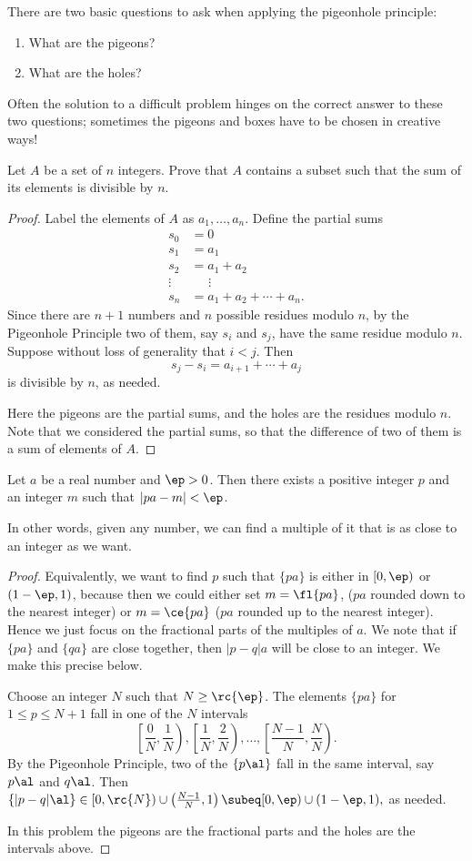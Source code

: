 There are two basic questions to ask when applying the pigeonhole principle:
\begin{enumerate}
\item
What are the pigeons?
\item
What are the holes?
\end{enumerate}
Often the solution to a difficult problem hinges on the correct answer to these two questions; sometimes the pigeons and boxes have to be chosen in creative ways!
\begin{ex}
Let $A$ be a set of $n$ integers. Prove that $A$ contains a subset such that the sum of its elements is divisible by $n$.
\end{ex}
\begin{proof}
Label the elements of $A$ as $a_1,\ldots,a_n$.  
Define the partial sums
\begin{align*}
s_0&=0\\
s_1&=a_1\\
s_2&=a_1+a_2\\
\vdots&\;\;\;\;\;\vdots\\
s_n&=a_1+a_2+ \cdots+a_n.
\end{align*}
Since there are $n+1$ numbers and $n$ possible residues modulo $n$, by the Pigeonhole Principle two of them, say $s_i$ and $s_j$, have the same residue modulo $n$. Suppose without loss of generality that $i<j$. Then 
\[s_j-s_i=a_{i+1}+\cdots +a_j\]
is divisible by $n$, as needed.

Here the pigeons are the partial sums, and the holes are the residues modulo $n$. Note that we considered the partial sums, so that the difference of two of them is a sum of elements of $A$. 
\end{proof}
\begin{thm} Let $a$ be a real number and $\ep>0$. Then there exists a positive integer $p$ and an integer $m$ such that $\left|pa-m\right|< \ep$.
\end{thm}
In other words, given any number, we can find a multiple of it that is as close to an integer as we want.
\begin{proof}
Equivalently, we want to find $p$ such that $\{pa\}$ is either in $[0,\ep)$ or $(1-\ep,1)$, because then we could either set $m=\fl{pa}$, ($pa$ rounded down to the nearest integer) or $m=\ce{pa}$ ($pa$ rounded up to the nearest integer). Hence we just focus on the fractional parts of the multiples of $a$. We note that if $\{pa\}$ and $\{qa\}$ are close together, then $|p-q|a$ will be close to an integer. We make this precise below. 

Choose an integer $N$ such that $N\ge\rc{\ep}$. 
The elements $\{pa\}$ for $1\leq p\leq N+1$ fall in one of the $N$ intervals
\[\left[\frac{0}{N},\frac{1}{N}\right),\left[\frac{1}{N},\frac{2}{N} \right),\ldots, \left[\frac{N-1}{N},\frac{N}{N}\right).\]
By the Pigeonhole Principle, two of the $\{p\al\}$ fall in the same interval, say $p\al$ and $q\al$. Then 
$\{|p-q|\al\}\in \left[ 0,\rc{N}\right) \cup \left(\frac{N-1}{N},1\right)
\subeq[0,\ep)\cup(1-\ep,1)
,$
as needed.

In this problem the pigeons are the fractional parts and the holes are the intervals above.
\end{proof}
